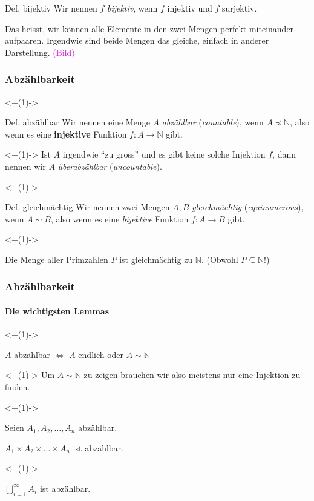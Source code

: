 \documentclass[t,dvipsnames]{beamer}
\newcommand{\hintIllustration}{\textcolor{Magenta}{(Bild)}}
\begin{document}
\begin{frame}
	\begin{block}{Def. bijektiv}
		Wir nennen $f$ \textit{bijektiv}, wenn $f$ injektiv und $f$ surjektiv.
	\end{block}
	Das heisst, wir können alle Elemente in den zwei Mengen perfekt miteinander aufpaaren. Irgendwie sind beide Mengen das gleiche, einfach in anderer Darstellung. \hintIllustration
\end{frame}

\begin{frame}
	\frametitle{Abzählbarkeit}
	\only<+(1)->{
		\begin{block}{Def. abzählbar}
			Wir nennen eine Menge $A$ \textit{abzählbar} (\textit{countable}), wenn $A \preceq \mathbb{N}$, also wenn es eine \textbf{injektive} Funktion $f: A \rightarrow \mathbb{N}$ gibt.

			\only<+(1)->{
				Ist $A$ irgendwie ``zu gross'' und es gibt keine solche Injektion $f$, dann nennen wir $A$ \textit{überabzählbar} (\textit{uncountable}).
			}
		\end{block}
	}

	\only<+(1)->{
		\begin{block}{Def. gleichmächtig}
			Wir nennen zwei Mengen $A, B$ \textit{gleichmächtig} (\textit{equinumerous}), wenn $A \sim B$, also wenn es eine \textit{bijektive} Funktion $f: A \rightarrow B$ gibt.
		\end{block}
	}

	\only<+(1)->{
		\begin{Beispiel}
			Die Menge aller Primzahlen $P$ ist gleichmächtig zu $\mathbb{N}$. (Obwohl $P \subseteq \mathbb{N}$!)
		\end{Beispiel}
	}
\end{frame}


\begin{frame}
	\frametitle{Abzählbarkeit}
	\framesubtitle{Die wichtigsten Lemmas}
	\only<+(1)->{
		\begin{Lemma}
			$A$ abzählbar $\iff$ $A$ endlich oder $A \sim \mathbb{N}$
		\end{Lemma}
	}
	\only<+(1)->{
		Um $A \sim \mathbb{N}$ zu zeigen brauchen wir also meistens nur eine Injektion zu finden.
	}

	\only<+(1)->{
		Seien $A_1, A_2, \ldots, A_n$ abzählbar.
		\begin{Lemma}
			$A_1 \times A_2 \times \ldots \times A_n$ ist abzählbar.
		\end{Lemma}
	}

	\only<+(1)->{
		\begin{Lemma}[Vereinigung]
			$\bigcup_{i = 1}^{\infty} A_i$ ist abzählbar.
		\end{Lemma}
	}
\end{frame}
\end{document}
